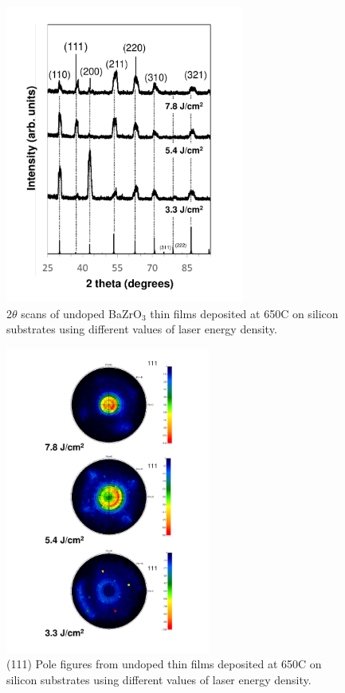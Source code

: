 \begin{figure}
    \centering
    \includegraphics[width=0.7\textwidth]{Figures/Energy_Density_Effect.pdf}
    \caption{2$\theta$ scans of undoped BaZrO$_3$ thin films deposited at 650\textdegree C on silicon substrates using different values of laser energy density.}
    \label{fig:energy_density:effect}
\end{figure}
\begin{figure}
    \centering
    \includegraphics[width=0.6\textwidth]{Figures/Energy_Density_Effect_Pole_Figures.pdf}
    \caption{(111) Pole figures from undoped thin films deposited at 650\textdegree C on silicon substrates using different values of laser energy density.}
    \label{fig:energy_density:effect:pole_figures}
\end{figure}

